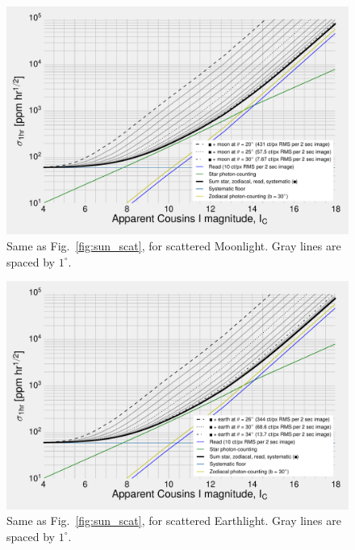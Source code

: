 \begin{figure}[!h]
	\centering
	\includegraphics{figures/precision_angles_moon.pdf}
	\caption{Same as Fig.~\protect\ref{fig:sun_scat}, for scattered Moonlight.
		Gray lines are spaced by $1^\circ$.} 
	\label{fig:moon_scat}
\end{figure}
\begin{figure}[!h]
	\centering
	\includegraphics{figures/precision_angles_earth.pdf}
	\caption{Same as Fig.~\protect\ref{fig:sun_scat}, for scattered 
		Earthlight. Gray lines are spaced by $1^\circ$.} 
	\label{fig:earth_scat}
\end{figure}

 

